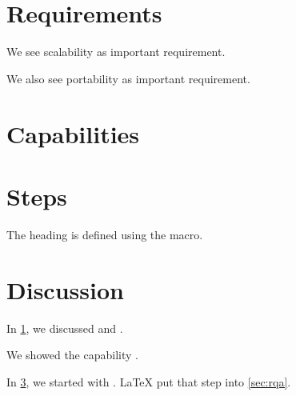 \documentclass{article}
\begin{document}



\section{Requirements}
\label{secreqs}
We see scalability as important requirement.

We also see portability as important requirement.


\section{Capabilities}


\section{Steps}
\label{sec:steps}

\label{sec:rqa}
The heading is defined using the macro.

\clearpage


\section{Discussion}
In \cref{secreqs}, we discussed  and .

We showed the capability .

In \cref{sec:steps}, we started with .
\LaTeX{} put that step into \cref{sec:rqa}.
\end{document}
